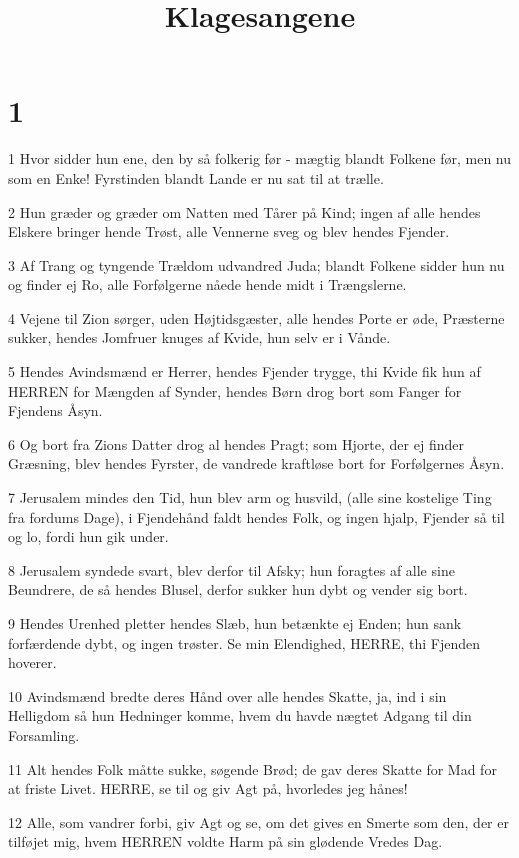 

\title{Klagesangene}


\chapter{1}

\par 1 Hvor sidder hun ene, den by så folkerig før - mægtig blandt Folkene før, men nu som en Enke! Fyrstinden blandt Lande er nu sat til at trælle.
\par 2 Hun græder og græder om Natten med Tårer på Kind; ingen af alle hendes Elskere bringer hende Trøst, alle Vennerne sveg og blev hendes Fjender.
\par 3 Af Trang og tyngende Trældom udvandred Juda; blandt Folkene sidder hun nu og finder ej Ro, alle Forfølgerne nåede hende midt i Trængslerne.
\par 4 Vejene til Zion sørger, uden Højtidsgæster, alle hendes Porte er øde, Præsterne sukker, hendes Jomfruer knuges af Kvide, hun selv er i Vånde.
\par 5 Hendes Avindsmænd er Herrer, hendes Fjender trygge, thi Kvide fik hun af HERREN for Mængden af Synder, hendes Børn drog bort som Fanger for Fjendens Åsyn.
\par 6 Og bort fra Zions Datter drog al hendes Pragt; som Hjorte, der ej finder Græsning, blev hendes Fyrster, de vandrede kraftløse bort for Forfølgernes Åsyn.
\par 7 Jerusalem mindes den Tid, hun blev arm og husvild, (alle sine kostelige Ting fra fordums Dage), i Fjendehånd faldt hendes Folk, og ingen hjalp, Fjender så til og lo, fordi hun gik under.
\par 8 Jerusalem syndede svart, blev derfor til Afsky; hun foragtes af alle sine Beundrere, de så hendes Blusel, derfor sukker hun dybt og vender sig bort.
\par 9 Hendes Urenhed pletter hendes Slæb, hun betænkte ej Enden; hun sank forfærdende dybt, og ingen trøster. Se min Elendighed, HERRE, thi Fjenden hoverer.
\par 10 Avindsmænd bredte deres Hånd over alle hendes Skatte, ja, ind i sin Helligdom så hun Hedninger komme, hvem du havde nægtet Adgang til din Forsamling.
\par 11 Alt hendes Folk måtte sukke, søgende Brød; de gav deres Skatte for Mad for at friste Livet. HERRE, se til og giv Agt på, hvorledes jeg hånes!
\par 12 Alle, som vandrer forbi, giv Agt og se, om det gives en Smerte som den, der er tilføjet mig, hvem HERREN voldte Harm på sin glødende Vredes Dag.
